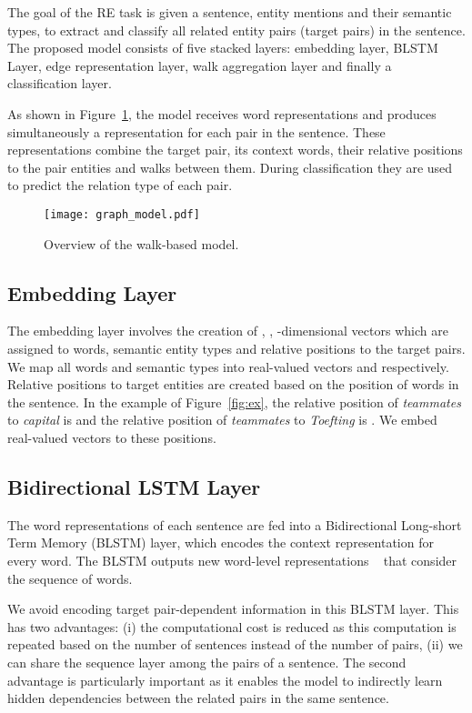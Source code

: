 \documentclass[11pt,a4paper]{article}
\begin{document}
    The goal of the RE task is given a sentence, entity mentions and their semantic types, to extract and classify all related entity pairs (target pairs) in the sentence.
	The proposed model consists of five stacked layers: embedding layer, BLSTM Layer, edge representation layer, walk aggregation layer and finally a classification layer. 
	
    As shown in Figure~\ref{fig:model}, the model receives word representations and produces simultaneously a representation for each pair in the sentence. 
    These representations combine the target pair, its context words, their relative positions to the pair entities and walks between them.
    During classification they are used to predict the relation type of each pair. 
	
    \begin{figure}[t!]
		\texttt{[image: graph\_model.pdf]}
		\caption{Overview of the walk-based model.}
		\label{fig:model}
	\end{figure}
    
\subsection{Embedding Layer}
    
	The embedding layer involves the creation of , , -dimensional vectors which are assigned to words, semantic entity types and relative positions to the target pairs. 
	We map all words and semantic types into real-valued vectors  and  respectively. 
	Relative positions to target entities are created based on the position of words in the sentence. 
	In the example of Figure~\ref{fig:ex}, the relative position of \textit{teammates} to \textit{capital} is  and the relative position of \textit{teammates} to \textit{Toefting} is . 
	We embed real-valued vectors  to these positions.
	
	
\subsection{Bidirectional LSTM Layer}
    
	The word representations of each sentence are fed into a Bidirectional Long-short Term Memory (BLSTM) layer, which encodes the context representation for every word. 
	The BLSTM outputs new word-level representations ~\cite{hochreiter1997long} that consider the sequence of words.
    
	We avoid encoding target pair-dependent information in this BLSTM layer. 
    This has two advantages: 
	(i) the computational cost is reduced as this computation is repeated based on the number of sentences instead of the number of pairs, 
	(ii) we can share the sequence layer among the pairs of a sentence. 
	The second advantage is particularly important as it enables the model to indirectly learn hidden dependencies between the related pairs in the same sentence. 
    
\end{document}

